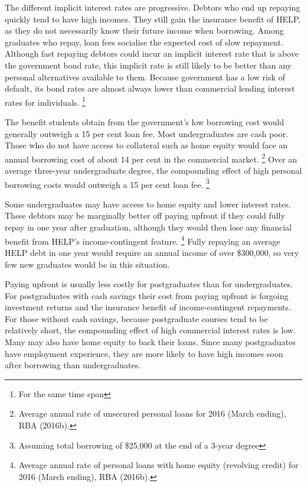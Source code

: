 \documentclass[embargoed]{grattan}
\begin{document}
{\begin{figure}
\end{figure}

The different implicit interest rates are progressive.
Debtors who end up repaying quickly tend to have high incomes.
They still gain the insurance benefit of \gls{HELP}, as they do not necessarily know their future income when borrowing.
Among graduates who repay, loan fees socialise the expected cost of slow repayment.
Although fast repaying debtors could incur an implicit interest rate that is above the government bond rate, this implicit rate is still likely to be better than any personal alternatives available to them.
Because government has a low risk of default, its bond rates are almost always lower than commercial lending interest rates for individuals.%
\footnote{For the same time span}

The benefit students obtain from the government's low borrowing cost would generally outweigh a 15 per cent loan fee.
Most undergraduates are cash poor.
Those who do not have access to collateral such as home equity would face an annual borrowing cost of about 14 per cent in the commercial market.%
\footnote{Average annual rate of unsecured personal loans for 2016 (March ending), RBA (2016b).} Over an average three-year undergraduate degree, the compounding effect of high personal borrowing costs would outweigh a 15 per cent loan fee.%
\footnote{Assuming total borrowing of \$25,000 at the end of a 3-year degree}

Some undergraduates may have access to home equity and lower interest rates.
These debtors may be marginally better off paying upfront if they could fully repay in one year after graduation, although they would then lose any financial benefit from \gls{HELP}'s income-contingent feature.%
\footnote{Average annual rate of personal loans with home equity (revolving credit) for 2016 (March ending), RBA (2016b).} Fully repaying an average \gls{HELP} debt in one year would require an annual income of over \$300,000, so very few new graduates would be in this situation.

Paying upfront is usually less costly for postgraduates than for undergraduates.
For postgraduates with cash savings their cost from paying upfront is forgoing investment returns and the insurance benefit of income-contingent repayments.
For those without cash savings, because postgraduate courses tend to be relatively short, the compounding effect of high commercial interest rates is low.
Many may also have home equity to back their loans.
Since many postgraduates have employment experience, they are more likely to have high incomes soon after borrowing than undergraduates.

}
\end{document}
